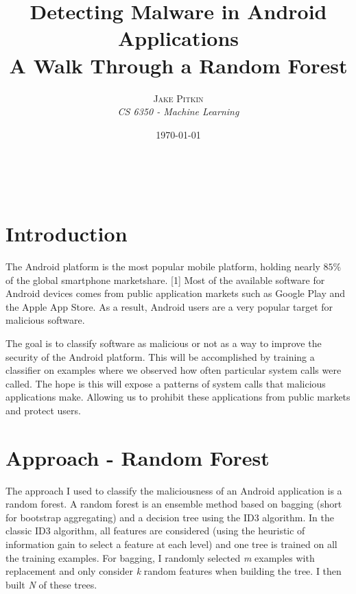\documentclass[a4paper, 11pt]{article} %
\title{\textbf{Detecting Malware in Android Applications}\\ %
A Walk Through a Random Forest} %
\author{\textsc{Jake Pitkin} %
\\{\textit{CS 6350 - Machine Learning}}} %
\date{\today} %
\makeatletter
\renewcommand{\maketitle}{ %
\begin{flushright} %
{\LARGE\@title} %

\vspace{50pt} %

{\large\@author} %
\\\@date %

\vspace{40pt} %
\end{flushright}
}
\makeatother
\begin{document}
\maketitle %




\section*{Introduction}

The Android platform is the most popular mobile platform, holding nearly $85\%$ of the global smartphone marketshare. [1] Most of the available software for Android devices comes from public application markets such as Google Play and the Apple App Store. As a result, Android users are a very popular target for malicious software. 

The goal is to classify software as malicious or not as a way to improve the security of the Android platform. This will be accomplished by training a classifier on examples where we observed how often particular system calls were called. The hope is this will expose a patterns of system calls that malicious applications make. Allowing us to prohibit these applications from public markets and protect users.
 

\section*{Approach - Random Forest}
The approach I used to classify the maliciousness of an Android application is a random forest. A random forest is an ensemble method based on bagging (short for bootstrap aggregating) and a decision tree using the ID3 algorithm. In the classic ID3 algorithm, all features are considered (using the heuristic of information gain to select a feature at each level) and one tree is trained on all the training examples. For bagging, I randomly selected \textit{m} examples with replacement and only consider \textit{k} random features when building the tree. I then built \textit{N} of these trees. 
\end{document}
